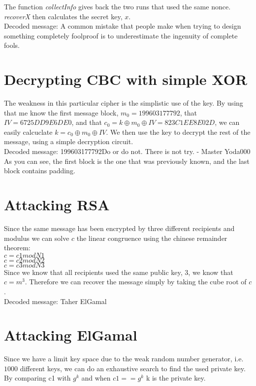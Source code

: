 \documentclass{article}
\begin{document}
The function \textit{collectInfo} gives back the two runs that used the same
nonce. \textit{recoverX} then calculates the secret key, $x$.\\

Decoded message: A common mistake that people make when trying to design something completely foolproof is to underestimate the ingenuity of complete fools.
\section{Decrypting CBC with simple XOR}

The weakness in this particular cipher is the simplistic use of the key. By
using that me know the first message block, $m_0 = 199603177792$, that $IV =
6725DD9E6DE0$, and that $c_0 = k \oplus m_0 \oplus IV = 823C1EE8E02D$, we can
easily calcuclate $k = c_0 \oplus m_0 \oplus IV$. We then use the key to decrypt
the rest of the message, using a simple decryption circuit.\\

Decoded message: 199603177792Do or do not. There is not try. - Master Yoda000 \\

As you can see, the first block is the one that was previously known, and the
last block contains padding.

\section{Attacking RSA}
Since the same message has been encrypted by three different recipients and modulus we can solve $c$ the linear congruence using the chinese remainder theorem:\\
$c = c1 mod N1$\\
$c = c2 mod N2$\\
$c = c3 mod N3$\\

Since we know that all recipients used the same public key, 3, we know that $c=m^3$. Therefore we can recover the message simply by taking the cube root of $c$.\\

Decoded message: Taher ElGamal

\section{Attacking ElGamal}

Since we have a limit key space due to the weak random number generator, i.e. $1000$ different keys,  we can do an exhaustive search to find the used private key. By comparing c1 with $g^k$ and when $c1==g^k$ k is the private key.\\
\end{document}
